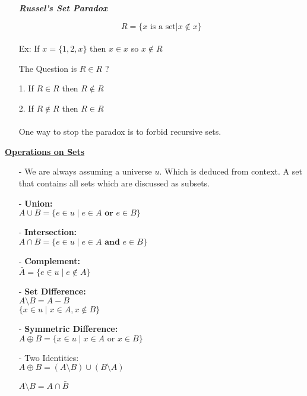 \documentclass[12pt]{article}
\begin{document}
\begin{itemize}
		 \begin{center}
		 	\textit{ \textbf{Russel's Set Paradox}} \\
		 	 \end{center}
		 	$$R = \{x \text{ is a set} | x \notin x\}$$ \\
		 	Ex: If $x = \{1, 2, x\}$ then $x\in x$ so $ x \notin R$
		 	
		 	The Question is $R \in R$ ?
		 	\item[1.] If $R \in R$ then $R \notin R$
		 	\item[2.] If $R \notin R$ then $R \in R$ \\
		 	\\ One way to stop the paradox is to forbid recursive sets. \\
		 		\end{itemize}		
	 		
		 	\begin{flushleft}
		 		\underline{\textbf{Operations on Sets}}
		 	\end{flushleft}
		 	
		 	\begin{itemize}
		 		\item[-] We are always assuming a universe $u$. Which is deduced from context. A set that contains all sets which are discussed as subsets.
		 		\item[-] \textbf{Union:} \\ 
		 		$A \cup B = \{e \in u\mid e \in A \textbf{ or } e \in B\}$
		 		\item[-] \textbf{Intersection:} \\ 
		 		$A \cap B =  \{e \in u\mid e \in A \textbf{ and } e \in B\}$
		 		\item[-] \textbf{Complement:} \\ 
		 		$\bar{A} =  \{e \in u\mid e \notin A\}$ 
		 		\item[-] \textbf{Set Difference:}\\
		 		$A \setminus B = A - B$ \\
		 		$\{x \in u \mid x \in A, x \notin B \}$
		 		\item[-] \textbf{Symmetric Difference:} \\
		 		$A \oplus B = \{x \in u \mid x \in A \text{ or } x \in B \} $ \\
		 		
		 		\item[-] Two Identities: \\
		 		$A \oplus B = (A\setminus B) \cup (B\setminus A)$ 
		 	
		 		$A \setminus B = A \cap \bar{B}$ \\
		 	\end{itemize}
	 	
\end{document}

